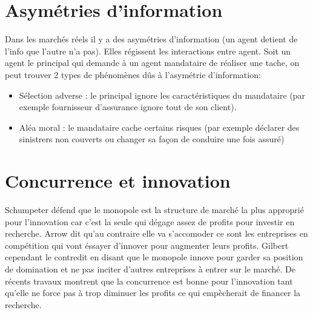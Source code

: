 
\section{Asymétries d'information} %
\label{sec:asymetries_d_information}

Dans les marchés réels il y a des asymétries d'information (un agent detient de l'info que l'autre n'a pas). Elles régissent les interactions entre agent. Soit un agent le principal qui demande à un agent mandataire de réaliser une tache, on peut trouver 2 types de phénomènes dûs à l'asymétrie d'information:
\begin{itemize}
	\item Sélection adverse : le principal ignore les caractéristiques du mandataire (par exemple fournisseur d'assurance ignore tout de son client).
	\item Aléa moral : le mandataire cache certains risques (par exemple déclarer des sinistrers non couverts ou changer sa façon de conduire une fois assuré)
\end{itemize}
\section{Concurrence et innovation} %
\label{sec:concurrence_et_innovation}

Schumpeter défend que le monopole est la structure de marché la plus approprié pour l'innovation car c'est la seule qui dégage assez de profits pour investir en recherche. Arrow dit qu'au contraire elle va s'accomoder ce sont les entreprises en compétition qui vont éssayer d'innover pour augmenter leurs profits. Gilbert cependant le contredit en disant que le monopole innove pour garder sa position de domination et ne pas inciter d'autres entreprises à entrer sur le marché. De récents travaux montrent que la concurrence est bonne pour l'innovation tant qu'elle ne force pas à trop diminuer les profits ce qui empècherait de financer la recherche.






